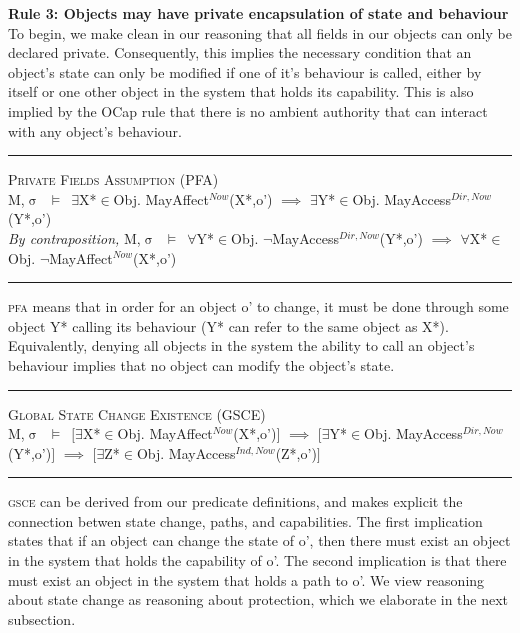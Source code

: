 \documentclass[a4paper,11pt, twoside,twocolumn]{article}
\newenvironment{logic}[1][]
{\begin{flushleft} \small }
{\end{flushleft}}
\newcommand{\loin}{$\in$}
\newcommand{\loforall}{$\forall$}
\newcommand{\loexists}{$\exists$}
\newcommand{\loimplies}{$\implies$}
\newcommand{\losigma}{$\upsigma$}
\newcommand{\loturns} {$\vDash$}
\newcommand{\loneg}{$\boldsymbol \neg$}
\newcommand{\ablock} {\null\qquad}
\begin{document}
\textbf{Rule 3: Objects may have private encapsulation of state and behaviour}\\
To begin, we make clean in our reasoning that all fields in our objects can only be declared private. Consequently, this implies the necessary condition that an object's state can only be modified if one of it's behaviour is called, either by itself or one other object in the system that holds its capability. This is also implied by the OCap rule that there is no ambient authority that can interact with any object's behaviour.
\begin{logic}
\hrule\null
\textsc{\normalsize *Private Fields Assumption (PFA)}\\
M,\losigma\ \loturns\ \loexists X*\loin Obj. MayAffect$^{Now}$(X*,o') \loimplies \linebreak
	\ablock \ablock \loexists Y*\loin Obj. MayAccess$^{Dir,Now}$(Y*,o')
\linebreak \\
\textit{By contraposition,}\linebreak
M,\losigma\ \loturns\ 	\loforall Y*\loin Obj. \loneg MayAccess$^{Dir,Now}$(Y*,o') \loimplies \linebreak
	\ablock \ablock \loforall X*\loin Obj. \loneg MayAffect$^{Now}$(X*,o')
\linebreak
\hrule
\end{logic}

\textsc{pfa} means that in order for an object o' to change, it must be done through some object Y* calling its behaviour (Y* can refer to the same object as X*). Equivalently, denying all objects in the system the ability to call an object's behaviour implies that no object can modify the object's state.\\



\begin{logic}
\hrule\null
\textsc{\normalsize *Global State Change Existence (GSCE)}\\
M,\losigma\ \loturns\ $[$\loexists X*\loin{Obj}. MayAffect$^{Now}$(X*,o')$]$\linebreak
\ablock \loimplies \linebreak
\ablock $[$\loexists Y*\loin{Obj}. MayAccess$^{Dir,Now}$(Y*,o')$]$\linebreak
\ablock \loimplies \linebreak
\ablock $[$\loexists Z*\loin{Obj}. MayAccess$^{Ind,Now}$(Z*,o')$]$
\linebreak\\
\hrule
\end{logic}
\textsc{gsce} can be derived from our predicate definitions, and makes explicit the connection betwen state change, paths, and capabilities. The first implication states that if an object can change the state of o', then there must exist an object in the system that holds the capability of o'. The second implication is that there must exist an object in the system that holds a path to o'.
We view reasoning about state change as reasoning about protection, which we elaborate in the next subsection.
\end{document}
